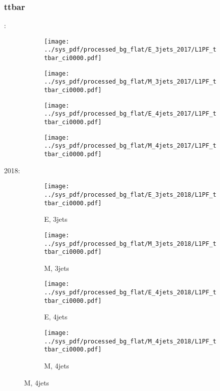 \documentclass{beamer}
\begin{document}
\begin{frame}
\frametitle{ttbar}
\fontsize{5}{1}:
\begin{figure}
\centering
\begin{subfigure}[b]{0.24\textwidth}
\texttt{[image: ../sys\_pdf/processed\_bg\_flat/E\_3jets\_2017/L1PF\_ttbar\_ci0000.pdf]}
\end{subfigure}
\begin{subfigure}[b]{0.24\textwidth}
\texttt{[image: ../sys\_pdf/processed\_bg\_flat/M\_3jets\_2017/L1PF\_ttbar\_ci0000.pdf]}
\end{subfigure}
\begin{subfigure}[b]{0.24\textwidth}
\texttt{[image: ../sys\_pdf/processed\_bg\_flat/E\_4jets\_2017/L1PF\_ttbar\_ci0000.pdf]}
\end{subfigure}
\begin{subfigure}[b]{0.24\textwidth}
\texttt{[image: ../sys\_pdf/processed\_bg\_flat/M\_4jets\_2017/L1PF\_ttbar\_ci0000.pdf]}
\end{subfigure}
\end{figure}
2018:
\begin{figure}
\centering
\begin{subfigure}[b]{0.24\textwidth}
\texttt{[image: ../sys\_pdf/processed\_bg\_flat/E\_3jets\_2018/L1PF\_ttbar\_ci0000.pdf]}
\captionsetup{font=tiny}
\caption{E, 3jets}
\end{subfigure}
\begin{subfigure}[b]{0.24\textwidth}
\texttt{[image: ../sys\_pdf/processed\_bg\_flat/M\_3jets\_2018/L1PF\_ttbar\_ci0000.pdf]}
\captionsetup{font=tiny}
\caption{M, 3jets}
\end{subfigure}
\begin{subfigure}[b]{0.24\textwidth}
\texttt{[image: ../sys\_pdf/processed\_bg\_flat/E\_4jets\_2018/L1PF\_ttbar\_ci0000.pdf]}
\captionsetup{font=tiny}
\caption{E, 4jets}
\end{subfigure}
\begin{subfigure}[b]{0.24\textwidth}
\texttt{[image: ../sys\_pdf/processed\_bg\_flat/M\_4jets\_2018/L1PF\_ttbar\_ci0000.pdf]}
\captionsetup{font=tiny}
\caption{M, 4jets}
\end{subfigure}
\end{figure}
\end{frame}
\end{document}
